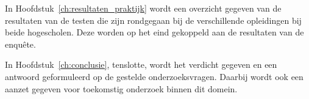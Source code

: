 In Hoofdstuk~\ref{ch:resultaten_praktijk} wordt een overzicht gegeven van de resultaten van de testen die zijn rondgegaan bij de verschillende opleidingen bij beide hogescholen. Deze worden op het eind gekoppeld aan de resultaten van de enquête. 

In Hoofdstuk~\ref{ch:conclusie}, tenslotte, wordt het verdicht gegeven en een antwoord geformuleerd op de gestelde onderzoeksvragen. Daarbij wordt ook een aanzet gegeven voor toekomstig onderzoek binnen dit domein.

